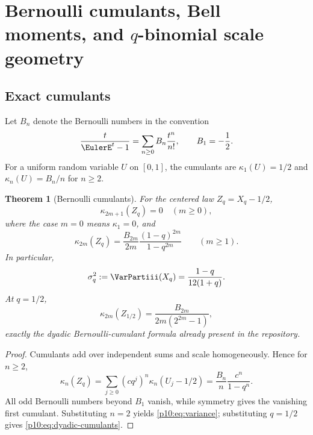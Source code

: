 \documentclass[11pt]{article}
\numberwithin{equation}{section}
\newtheorem{theorem}{Theorem}[section]
\theoremstyle{definition}
\theoremstyle{remark}
\begin{document}
\section{Bernoulli cumulants, Bell moments, and \texorpdfstring{$q$}{q}-binomial scale geometry}
\label{p10:sec:bell}

\subsection{Exact cumulants}

Let $B_n$ denote the Bernoulli numbers in the convention
\[
 \frac{t}{\EulerE^t-1}=\sum_{n\ge0}B_n\frac{t^n}{n!},
 \qquad B_1=-\frac12.
\]
For a uniform random variable $U$ on $[0,1]$, the cumulants are
$\kappa_1(U)=1/2$ and $\kappa_n(U)=B_n/n$ for $n\ge2$.

\begin{theorem}[Bernoulli cumulants]
\label{p10:thm:cumulants}
For the centered law $Z_q=X_q-1/2$,
\begin{equation}
 \kappa_{2m+1}(Z_q)=0\quad(m\ge0),                            \label{p10:eq:odd-cumulants}
\end{equation}
where the case $m=0$ means $\kappa_1=0$, and
\begin{equation}
 \boxed{\displaystyle
 \kappa_{2m}(Z_q)
 =\frac{B_{2m}}{2m}\frac{(1-q)^{2m}}{1-q^{2m}}}
 \qquad(m\ge1).                                             \label{p10:eq:q-cumulants}
\end{equation}
In particular,
\begin{equation}
 \sigma_q^2:=\VarPartiii(X_q)=\frac{1-q}{12(1+q)}.                  \label{p10:eq:variance}
\end{equation}
At $q=1/2$,
\begin{equation}
 \kappa_{2m}(Z_{1/2})
 =\frac{B_{2m}}{2m(2^{2m}-1)},                               \label{p10:eq:dyadic-cumulants}
\end{equation}
exactly the dyadic Bernoulli-cumulant formula already present in the repository.
\end{theorem}

\begin{proof}
Cumulants add over independent sums and scale homogeneously.  Hence for $n\ge2$,
\[
 \kappa_n(Z_q)
 =\sum_{j\ge0}(cq^j)^n\kappa_n(U_j-1/2)
 =\frac{B_n}{n}\frac{c^n}{1-q^n}.
\]
All odd Bernoulli numbers beyond $B_1$ vanish, while symmetry gives the vanishing first
cumulant.  Substituting $n=2$ yields \eqref{p10:eq:variance}; substituting $q=1/2$ gives
\eqref{p10:eq:dyadic-cumulants}.
\end{proof}
\end{document}
